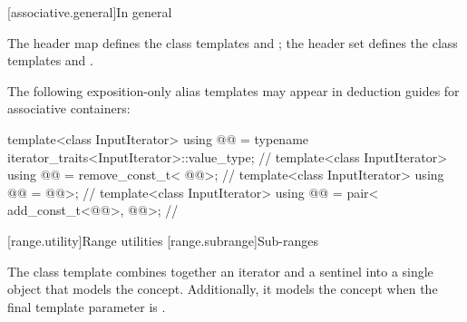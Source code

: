 \documentclass{wg21}
\begin{document}
[associative.general]{In general}

\pnum
The header map defines the class templates  and
; the header set defines the class templates
 and .

\pnum
The following exposition-only alias templates may appear in deduction guides for associative containers:
\begin{codeblock}
    template<class InputIterator>
    using @@ =
    typename iterator_traits<InputIterator>::value_type;                // \expos
    template<class InputIterator>
    using @@ = remove_const_t<
    @@>;   // \expos
    template<class InputIterator>
    using @@ =
    @@>;   // \expos
    template<class InputIterator>
    using @@ = pair<
    add_const_t<@@>,
    @@>;  // \expos
\end{codeblock}


[range.utility]{Range utilities}
[range.subrange]{Sub-ranges}

\pnum
The  class template combines together an
iterator and a sentinel into a single object that models the
 concept. Additionally, it models the
 concept when the final template parameter is
.
\end{document}
